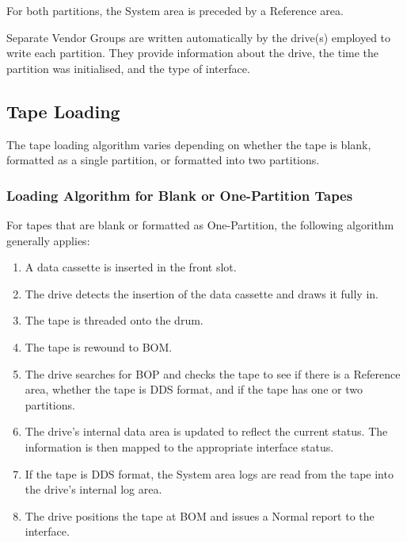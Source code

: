 \documentclass[11pt]{article}
\begin{document}
For both partitions, the System area is preceded by a Reference area.

Separate Vendor Groups are written automatically by the drive(s) employed to
write each partition. They provide information about the drive, the time the
partition was initialised, and the type of interface.

\subsection {Tape Loading}

The tape loading algorithm varies depending on whether the tape is blank,
formatted as a single partition, or formatted into two partitions.

\subsubsection {Loading Algorithm for Blank or One-Partition Tapes}

For tapes that are blank or formatted as One-Partition, the following
algorithm generally applies:

\begin {enumerate}

\item A data cassette is inserted in the front slot.

\item The drive detects the insertion of the data cassette and draws it
fully in.

\item The tape is threaded onto the drum.

\item The tape is rewound to BOM.

\item The drive searches for BOP and checks the tape to see if there is a
Reference area, whether the tape is DDS format, and if the tape has one or
two partitions.

\item The drive's internal data area is updated to reflect the current
status. The information is then mapped to the appropriate interface status.

\item If the tape is DDS format, the System area logs are read from the tape
into the drive's internal log area.

\item The drive positions the tape at BOM and issues a Normal report to the
interface.

\end {enumerate}
\end{document}
